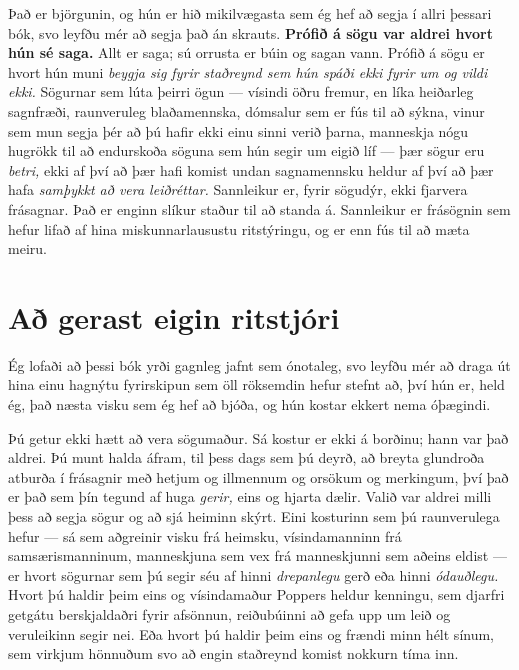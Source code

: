 Það er björgunin, og hún er hið mikilvægasta sem ég hef að segja í allri þessari bók, svo leyfðu mér að segja það án skrauts. \textbf{Prófið á sögu var aldrei hvort hún sé saga.} Allt er saga; sú orrusta er búin og sagan vann. Prófið á sögu er hvort hún muni \emph{beygja sig fyrir staðreynd sem hún spáði ekki fyrir um og vildi ekki.} Sögurnar sem lúta þeirri ögun — vísindi öðru fremur, en líka heiðarleg sagnfræði, raunveruleg blaðamennska, dómsalur sem er fús til að sýkna, vinur sem mun segja þér að þú hafir ekki einu sinni verið þarna, manneskja nógu hugrökk til að endurskoða söguna sem hún segir um eigið líf — þær sögur eru \emph{betri,} ekki af því að þær hafi komist undan sagnamennsku heldur af því að þær hafa \emph{samþykkt að vera leiðréttar.} Sannleikur er, fyrir sögudýr, ekki fjarvera frásagnar. Það er enginn slíkur staður til að standa á. Sannleikur er frásögnin sem hefur lifað af hina miskunnarlausustu ritstýringu, og er enn fús til að mæta meiru.

\section*{Að gerast eigin ritstjóri}

Ég lofaði að þessi bók yrði gagnleg jafnt sem ónotaleg, svo leyfðu mér að draga út hina einu hagnýtu fyrirskipun sem öll röksemdin hefur stefnt að, því hún er, held ég, það næsta visku sem ég hef að bjóða, og hún kostar ekkert nema óþægindi.

Þú getur ekki hætt að vera sögumaður. Sá kostur er ekki á borðinu; hann var það aldrei. Þú munt halda áfram, til þess dags sem þú deyrð, að breyta glundroða atburða í frásagnir með hetjum og illmennum og orsökum og merkingum, því það er það sem þín tegund af huga \emph{gerir,} eins og hjarta dælir. Valið var aldrei milli þess að segja sögur og að sjá heiminn skýrt. Eini kosturinn sem þú raunverulega hefur — sá sem aðgreinir visku frá heimsku, vísindamanninn frá samsærismanninum, manneskjuna sem vex frá manneskjunni sem aðeins eldist — er hvort sögurnar sem þú segir séu af hinni \emph{drepanlegu} gerð eða hinni \emph{ódauðlegu.} Hvort þú haldir þeim eins og vísindamaður Poppers heldur kenningu, sem djarfri getgátu berskjaldaðri fyrir afsönnun, reiðubúinni að gefa upp um leið og veruleikinn segir nei. Eða hvort þú haldir þeim eins og frændi minn hélt sínum, sem virkjum hönnuðum svo að engin staðreynd komist nokkurn tíma inn.

